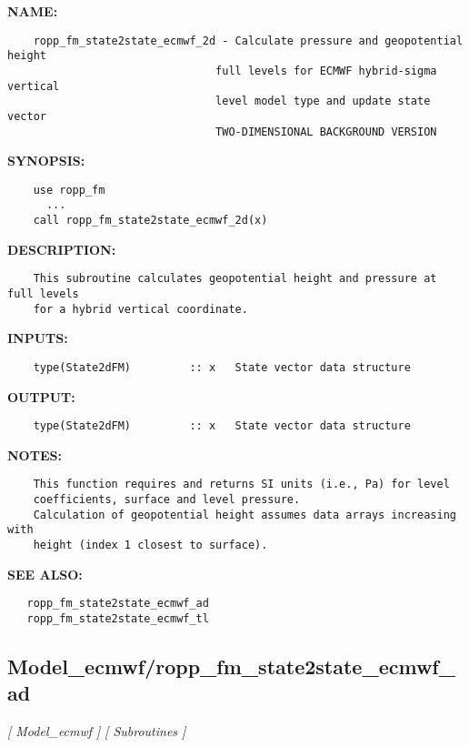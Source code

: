 \label{ch:robo58}
\label{ch:Model_ecmwf_ropp_fm_state2state_ecmwf_2d}
\textbf{NAME:}\hspace{0.08in}\begin{Verbatim}
    ropp_fm_state2state_ecmwf_2d - Calculate pressure and geopotential height
                                full levels for ECMWF hybrid-sigma vertical 
                                level model type and update state vector
                                TWO-DIMENSIONAL BACKGROUND VERSION
\end{Verbatim}
\textbf{SYNOPSIS:}\hspace{0.08in}\begin{Verbatim}
    use ropp_fm
      ...
    call ropp_fm_state2state_ecmwf_2d(x)
\end{Verbatim}
\textbf{DESCRIPTION:}\hspace{0.08in}\begin{Verbatim}
    This subroutine calculates geopotential height and pressure at full levels
    for a hybrid vertical coordinate.
\end{Verbatim}
\textbf{INPUTS:}\hspace{0.08in}\begin{Verbatim}
    type(State2dFM)         :: x   State vector data structure
\end{Verbatim}
\textbf{OUTPUT:}\hspace{0.08in}\begin{Verbatim}
    type(State2dFM)         :: x   State vector data structure
\end{Verbatim}
\textbf{NOTES:}\hspace{0.08in}\begin{Verbatim}
    This function requires and returns SI units (i.e., Pa) for level 
    coefficients, surface and level pressure.
    Calculation of geopotential height assumes data arrays increasing with 
    height (index 1 closest to surface).
\end{Verbatim}
\textbf{SEE ALSO:}\hspace{0.08in}\begin{Verbatim}
   ropp_fm_state2state_ecmwf_ad
   ropp_fm_state2state_ecmwf_tl
\end{Verbatim}
\subsection{Model\_ecmwf/ropp\_fm\_state2state\_ecmwf\_ad}
\textsl{[ Model\_ecmwf ]}
\textsl{[ Subroutines ]}

